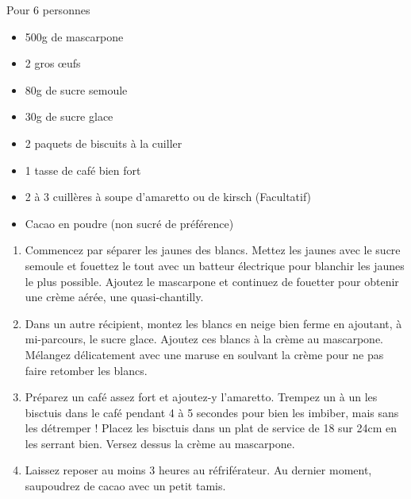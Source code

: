 \medskip
\phantom{.}

\medskip
{}
{Pour 6 personnes}{\begin{itemize}
\item 500g de mascarpone
\item 2 gros \oe ufs
\item 80g de sucre semoule
\item 30g de sucre glace
\item 2 paquets de biscuits à la cuiller
\item 1 tasse de café bien fort
\item 2 à 3 cuillères à soupe d'amaretto ou de kirsch (Facultatif)
\item Cacao en poudre (non sucré de préférence)
\end{itemize}}
{\begin{enumerate}
\item Commencez par séparer les jaunes des blancs. Mettez les jaunes avec  le sucre semoule et fouettez le tout avec un batteur électrique pour blanchir les jaunes le plus possible. Ajoutez le mascarpone et continuez de fouetter pour obtenir une crème aérée, une quasi-chantilly.
\item Dans un autre récipient, montez les blancs en neige bien ferme en ajoutant, à mi-parcours, le sucre glace. Ajoutez ces blancs à la crème au mascarpone. Mélangez délicatement avec une maruse en soulvant la crème pour ne pas faire retomber les blancs.
\item Préparez un café assez fort et ajoutez-y l'amaretto. Trempez un à un les bisctuis dans le café pendant 4 à 5 secondes pour bien les imbiber, mais sans les détremper ! Placez les bisctuis dans un plat de service de 18 sur 24cm en les serrant bien. Versez dessus la crème au mascarpone.
\item Laissez reposer au moins 3 heures au réfriférateur. Au dernier moment, saupoudrez de cacao avec un petit tamis. 
\end{enumerate}}

